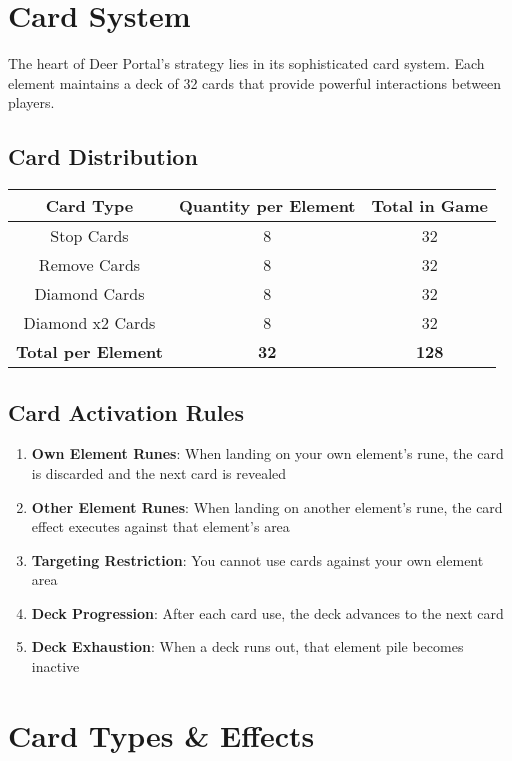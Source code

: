 \documentclass[12pt,a4paper]{article}
\begin{document}
\section{Card System}

The heart of Deer Portal's strategy lies in its sophisticated card system. Each element maintains a deck of 32 cards that provide powerful interactions between players.

\subsection{Card Distribution}
\begin{center}
\begin{tabular}{|c|c|c|}
\hline
\textbf{Card Type} & \textbf{Quantity per Element} & \textbf{Total in Game} \\
\hline
Stop Cards & 8 & 32 \\
Remove Cards & 8 & 32 \\
Diamond Cards & 8 & 32 \\
Diamond x2 Cards & 8 & 32 \\
\hline
\textbf{Total per Element} & \textbf{32} & \textbf{128} \\
\hline
\end{tabular}
\end{center}

\subsection{Card Activation Rules}
\begin{enumerate}
    \item \textbf{Own Element Runes}: When landing on your own element's rune, the card is discarded and the next card is revealed
    \item \textbf{Other Element Runes}: When landing on another element's rune, the card effect executes against that element's area
    \item \textbf{Targeting Restriction}: You cannot use cards against your own element area
    \item \textbf{Deck Progression}: After each card use, the deck advances to the next card
    \item \textbf{Deck Exhaustion}: When a deck runs out, that element pile becomes inactive
\end{enumerate}

\section{Card Types \& Effects}
\end{document}

